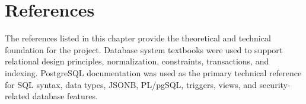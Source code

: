 \chapter{References}

The references listed in this chapter provide the theoretical and technical foundation for the project. Database system textbooks were used to support relational design principles, normalization, constraints, transactions, and indexing. PostgreSQL documentation was used as the primary technical reference for SQL syntax, data types, JSONB, PL/pgSQL, triggers, views, and security-related database features.

\nocite{*}
\printbibliography[heading=none]
